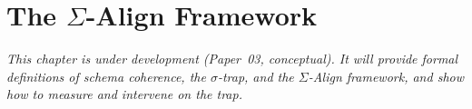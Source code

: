 \chapter{The $\Sigma$-Align Framework}
\label{ch:sigma-align-framework}

\textit{This chapter is under development (Paper~03, conceptual). It will provide formal
definitions of schema coherence, the $\sigma$-trap, and the $\Sigma$-Align framework,
and show how to measure and intervene on the trap.}
